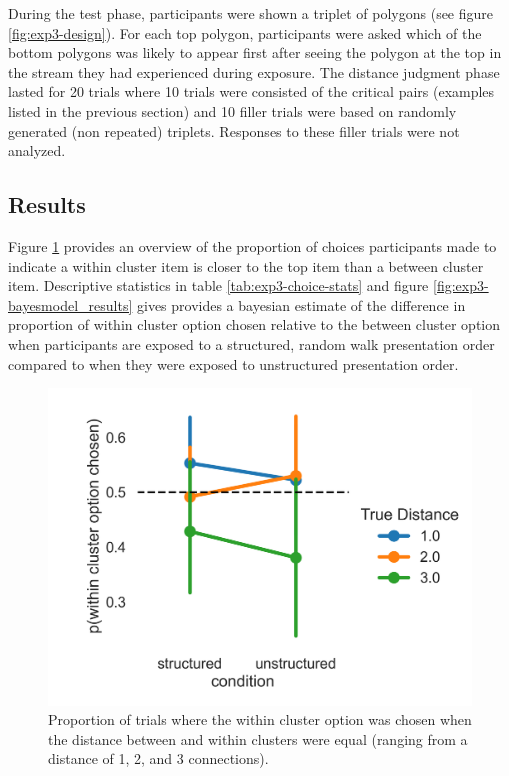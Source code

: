 During the test phase, participants were shown a triplet of polygons (see figure \ref{fig:exp3-design}). For each top polygon, participants were asked which of the bottom polygons was likely to appear first after seeing the polygon at the top in the stream they had experienced during exposure. The distance judgment phase lasted for 20 trials where 10 trials were consisted of the critical pairs (examples listed in the previous section) and 10 filler trials were based on randomly generated (non repeated) triplets. Responses to these filler trials were not analyzed.

\subsection{Results}

Figure \ref{fig:exp3-choice-results} provides an overview of the proportion of choices participants made to indicate a within cluster item is closer to the top item than a between cluster item. Descriptive statistics in table \ref{tab:exp3-choice-stats} and figure \ref{fig:exp3-bayesmodel_results} gives provides a bayesian estimate of the difference in proportion of within cluster option chosen relative to the between cluster option when participants are exposed to a structured, random walk presentation order compared to when they were exposed to unstructured presentation order.

\begin{figure}
    \centering
    \includegraphics[width = \textwidth]{chapter_notebooks/chapter_3/figures/exp3_choice_results.png}
    \caption{Proportion of trials where the within cluster option was chosen when the distance between and within clusters were equal (ranging from a distance of 1, 2, and 3 connections).}
    \label{fig:exp3-choice-results}
\end{figure}

